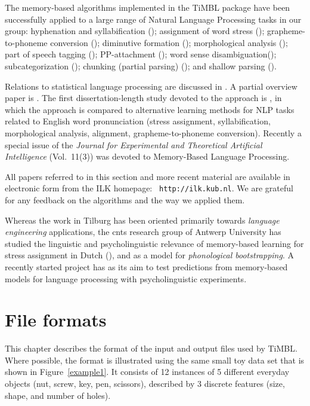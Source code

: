 \documentclass{report}
\begin{document}
The memory-based algorithms implemented in the TiMBL package have been
successfully applied to a large range of Natural Language Processing
tasks in our group: hyphenation and syllabification
(\cite{Daelemans+92b}); assignment of word stress
(\cite{Daelemans+94b}); grapheme-to-phoneme conversion
(\cite{Daelemans+96}); diminutive formation (\cite{Daelemans+97e});
morphological analysis (\cite{Vandenbosch+96,Vandenbosch+99}); part of speech tagging
(\cite{Daelemans+96b,Zavrel+99}); PP-attachment (\cite{Zavrel+97b}); word sense
disambiguation(\cite{Veenstra+00}); subcategorization
(\cite{Buchholz98}); chunking (partial parsing)
(\cite{Veenstra98}); and shallow parsing (\cite{Daelemans+99,Buchholz+99}).

Relations to statistical language processing are discussed in
\cite{Zavrel+97}.  A partial overview paper is \cite{Daelemans95}.
The first dissertation-length study devoted to the approach is
\cite{VandenBosch97}, in which the approach is compared to alternative
learning methods for NLP tasks related to English word pronunciation
(stress assignment, syllabification, morphological analysis,
alignment, grapheme-to-phoneme conversion). Recently a special issue
of the {\em Journal for Experimental and Theoretical Artificial
Intelligence} (Vol.~11(3)) was devoted to Memory-Based Language
Processing.

All papers referred to in this section and more recent material are
available in electronic form from the {\sc ILK} homepage: {\tt
http://ilk.kub.nl}.  We are grateful for any feedback on the
algorithms and the way we applied them.

Whereas the work in Tilburg has been oriented primarily towards {\em
language engineering} applications, the {\sc cnts} research group of
Antwerp University has studied the linguistic and psycholinguistic
relevance of memory-based learning for stress assignment in Dutch
(\cite{Daelemans+94b,Gillis+95}), and as a model for {\em phonological
bootstrapping}.  A recently started project has as its aim to test
predictions from memory-based models for language processing with
psycholinguistic experiments.

\chapter{File formats}
\label{fileformats}

This chapter describes the format of the input and output files used
by TiMBL. Where possible, the format is illustrated using the same
small toy data set that is shown in Figure~\ref{example1}. It consists
of 12 instances of 5 different everyday objects (nut, screw, key, pen,
scissors), described by 3 discrete features (size, shape, and number
of holes).
\end{document}
